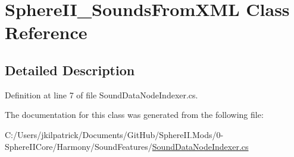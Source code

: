 \hypertarget{class_sphere_i_i___sounds_from_x_m_l}{}\section{Sphere\+I\+I\+\_\+\+Sounds\+From\+X\+ML Class Reference}
\label{class_sphere_i_i___sounds_from_x_m_l}


\subsection{Detailed Description}


Definition at line 7 of file Sound\+Data\+Node\+Indexer.\+cs.



The documentation for this class was generated from the following file\+:\begin{DoxyCompactItemize}
\item 
C\+:/\+Users/jkilpatrick/\+Documents/\+Git\+Hub/\+Sphere\+I\+I.\+Mods/0-\/\+Sphere\+I\+I\+Core/\+Harmony/\+Sound\+Features/\mbox{\hyperlink{_sound_data_node_indexer_8cs}{Sound\+Data\+Node\+Indexer.\+cs}}\end{DoxyCompactItemize}
